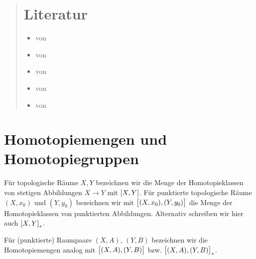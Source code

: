 
\newcommand{\fach}{Topologie \RM{3}. -- Homotopietheorie}
\newcommand{\semester}{SoSe 2017}
\newcommand{\homepage}{https://wwwmath.uni-muenster.de/reine/u/topos/lehre/WS2015-2016/Topologie2/}

\newcommand{\prof}{Prof.\ Dr.\ Michael Joachim}
\publishers{\scalebox{11}{\Huge$\pi_n$}}



\maketitle
\begin{abstract}


\section*{Literatur}
\begin{itemize}
	\item {} von \textcite{Hatcher}
	\item {} von \textcite{Bred}
	\item {} von \textcite{tomDieckalgebraic}
	\item {} von \textcite{tomDieckhomotopietheorie}
	\item {} von \textcite{whitehead2012elements}
\end{itemize}
\end{abstract}

\tableofcontents
\cleardoubleoddemptypage

\setcounter{page}{1}
\setcounter{footnote}{0}

\setcounter{section}{0}

\section{Homotopiemengen und Homotopiegruppen} %
\label{sec:homotopiemengen_und_homotopiegruppen}

\begin{definition}[{name=[Homotopiemengen]}]
	Für topologische Räume $X,Y$ bezeichnen wir die Menge der Homotopieklassen von stetigen Abbildungen $X \to Y$ mit $\benbrace*{X,Y}$.
	Für punktierte topologische Räume $(X,x_0)$ und $(Y,y_0)$ bezeichnen wir mit $\benbrace[\big]{(X,x_0),(Y,y_0)}$ die Menge der Homotopieklassen von punktierten Abbildungen.
	Alternativ schreiben wir hier auch $\benbrace*{X,Y}_*$.
	
	Für (punktierte) Raumpaare $(X,A)$, $(Y,B)$ bezeichnen wir die Homotopiemengen analog mit $\benbrace[\big]{(X,A),(Y,B)}$ bzw. $\benbrace[\big]{(X,A),(Y,B)}_*$.
\end{definition}

